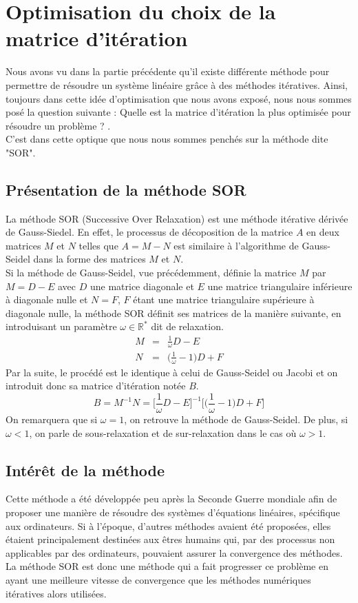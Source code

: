 \chapter{Optimisation du choix de la matrice d'itération}
Nous avons vu dans la partie précédente qu'il existe différente méthode pour permettre de résoudre un système linéaire grâce à des méthodes itératives. Ainsi, toujours dans cette idée d'optimisation que nous avons exposé, nous nous sommes posé la question suivante : \og Quelle est la matrice d'itération la plus optimisée pour résoudre un problème ? \fg.\\

C'est dans cette optique que nous nous sommes penchés sur la méthode dite "SOR".
\section{Présentation de la méthode SOR}
La méthode SOR (Successive Over Relaxation) est une méthode itérative dérivée de Gauss-Siedel. En effet, le processus de décoposition de la matrice $A$ en deux matrices $M$ et $N$ telles que $A=M-N$ est similaire à l'algorithme de Gauss-Seidel dans la forme des matrices $M$ et $N$.\\

Si la méthode de Gauss-Seidel, vue précédemment, définie la matrice $M$ par $M=D-E$ avec $D$ une matrice diagonale et $E$ une matrice triangulaire inférieure à diagonale nulle et $N=F$, $F$ étant une matrice triangulaire supérieure à diagonale nulle, la méthode SOR définit ses matrices de la manière suivante, en introduisant un paramètre $\omega \in \mathbb{R}^*$ dit de relaxation.
\begin{eqnarray}
M &=& \frac{1}{\omega}D-E\\
N &=& \bigg(\frac{1}{\omega}-1\bigg)D+F
\end{eqnarray}
Par la suite, le procédé est le identique à celui de Gauss-Seidel ou Jacobi et on introduit donc sa matrice d'itération notée $B$.
\begin{equation}
	B=M^{-1}N=\bigg[\frac{1}{\omega}D-E\bigg]^{-1}\bigg[\bigg(\frac{1}{\omega}-1\bigg)D+F\bigg]
\end{equation}
On remarquera que si $\omega=1$, on retrouve la méthode de Gauss-Seidel. De plus, si $\omega<1$, on parle de sous-relaxation et de sur-relaxation dans le cas où $\omega>1$.
\section{Intérêt de la méthode}
Cette méthode a été développée peu après la Seconde Guerre mondiale afin de proposer une manière de résoudre des systèmes d'équations linéaires, spécifique aux ordinateurs. Si à l'époque, d'autres méthodes avaient été proposées, elles étaient principalement destinées aux êtres humains qui, par des processus non applicables par des ordinateurs, pouvaient assurer la convergence des méthodes. La méthode SOR est donc une méthode qui a fait progresser ce problème en ayant une meilleure vitesse de convergence que les méthodes numériques itératives alors utilisées.\\

